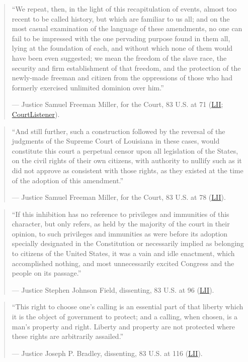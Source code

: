 \documentclass[12pt]{article}
\begin{document}
\begin{quote}
``We repeat, then, in the light of this recapitulation of events, almost too recent to be called history, but which are familiar to us all; and on the most casual examination of the language of these amendments, no one can fail to be impressed with the one pervading purpose found in them all, lying at the foundation of each, and without which none of them would have been even suggested; we mean the freedom of the slave race, the security and firm establishment of that freedom, and the protection of the newly-made freeman and citizen from the oppressions of those who had formerly exercised unlimited dominion over him.''

--- Justice Samuel Freeman Miller, for the Court, 83 U.S. at 71 (\href{https://www.law.cornell.edu/supremecourt/text/83/36}{LII}; \href{https://www.courtlistener.com/opinion/88661/butchers-benevolent-assn-v-crescent-city-live-stock-landing/}{CourtListener}).
\end{quote}

\begin{quote}
``And still further, such a construction followed by the reversal of the judgments of the Supreme Court of Louisiana in these cases, would constitute this court a perpetual censor upon all legislation of the States, on the civil rights of their own citizens, with authority to nullify such as it did not approve as consistent with those rights, as they existed at the time of the adoption of this amendment.''

--- Justice Samuel Freeman Miller, for the Court, 83 U.S. at 78 (\href{https://www.law.cornell.edu/supremecourt/text/83/36}{LII}).
\end{quote}

\begin{quote}
``If this inhibition has no reference to privileges and immunities of this character, but only refers, as held by the majority of the court in their opinion, to such privileges and immunities as were before its adoption specially designated in the Constitution or necessarily implied as belonging to citizens of the United States, it was a vain and idle enactment, which accomplished nothing, and most unnecessarily excited Congress and the people on its passage.''

--- Justice Stephen Johnson Field, dissenting, 83 U.S. at 96 (\href{https://www.law.cornell.edu/supremecourt/text/83/36}{LII}).
\end{quote}

\begin{quote}
``This right to choose one's calling is an essential part of that liberty which it is the object of government to protect; and a calling, when chosen, is a man's property and right. Liberty and property are not protected where these rights are arbitrarily assailed.''

--- Justice Joseph P. Bradley, dissenting, 83 U.S. at 116 (\href{https://www.law.cornell.edu/supremecourt/text/83/36}{LII}).
\end{quote}
\end{document}
